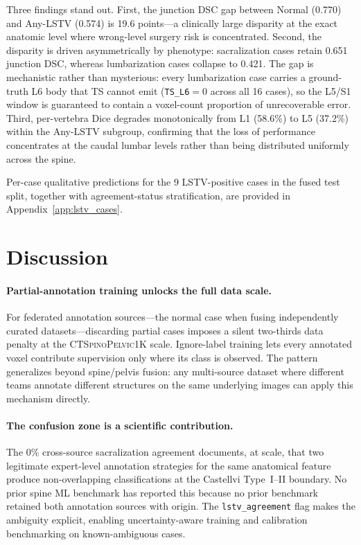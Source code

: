 \documentclass[pmlr]{jmlr}
\newcommand{\dataset}{\textsc{CTSpinoPelvic1K}}
\begin{document}
Three findings stand out.
First, the junction DSC gap between Normal (0.770) and Any-LSTV
(0.574) is 19.6 points---a clinically large disparity at the
exact anatomic level where wrong-level surgery risk is
concentrated.
Second, the disparity is driven asymmetrically by phenotype:
sacralization cases retain 0.651 junction DSC, whereas
lumbarization cases collapse to 0.421.
The gap is mechanistic rather than mysterious: every
lumbarization case carries a ground-truth L6 body that TS cannot
emit (\texttt{TS\_L6}${=}0$ across all 16 cases), so the L5/S1
window is guaranteed to contain a voxel-count proportion of
unrecoverable error.
Third, per-vertebra Dice degrades monotonically from L1 (58.6\%)
to L5 (37.2\%) within the Any-LSTV subgroup, confirming that the
loss of performance concentrates at the caudal lumbar levels
rather than being distributed uniformly across the spine.

Per-case qualitative predictions for the 9 LSTV-positive cases in
the fused test split, together with agreement-status
stratification, are provided in Appendix~\ref{app:lstv_cases}.

\section{Discussion}
\label{sec:discussion}

\paragraph{Partial-annotation training unlocks the full data scale.}
For federated annotation sources---the normal case when fusing
independently curated datasets---discarding partial cases imposes a
silent two-thirds data penalty at the \dataset{} scale.
Ignore-label training lets every annotated voxel contribute
supervision only where its class is observed.
The pattern generalizes beyond spine/pelvis fusion: any multi-source
dataset where different teams annotate different structures on the
same underlying images can apply this mechanism directly.

\paragraph{The confusion zone is a scientific contribution.}
The 0\% cross-source sacralization agreement documents, at scale,
that two legitimate expert-level annotation strategies for the same
anatomical feature produce non-overlapping classifications at the
Castellvi Type~I--II boundary.
No prior spine ML benchmark has reported this because no prior
benchmark retained both annotation sources with origin.
The \texttt{lstv\_agreement} flag makes the ambiguity explicit,
enabling uncertainty-aware training and calibration benchmarking
on known-ambiguous cases.
\end{document}
